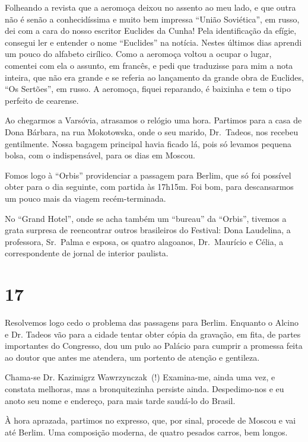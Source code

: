 Folheando a revista que a aeromoça deixou no assento ao meu lado, e que outra não é senão a conhecidíssima e muito bem impressa ``União Soviética'', em russo, dei com a cara do nosso escritor Euclides da Cunha! Pela identificação da efígie, consegui ler e entender o nome ``Euclides'' na notícia. Nestes últimos dias aprendi um pouco do alfabeto cirílico. Como a aeromoça voltou a ocupar o lugar, comentei com ela o assunto, em francês, e pedi que traduzisse para mim a nota inteira, que não era grande e se referia ao lançamento da grande obra de Euclides, ``Os Sertões'', em russo. A aeromoça, fiquei reparando, é baixinha e tem o tipo perfeito de cearense.

Ao chegarmos a Varsóvia, atrasamos o relógio uma hora. Partimos para a casa de Dona Bárbara, na rua Mokotowska, onde o seu marido, Dr.~Tadeos, nos recebeu gentilmente. Nossa bagagem principal havia ficado lá, pois só levamos pequena bolsa, com o indispensável, para os dias em Moscou.

Fomos logo à ``Orbis'' providenciar a passagem para Berlim, que só foi possível obter para o dia seguinte, com partida às 17h15m. Foi bom, para descansarmos um pouco mais da viagem recém-terminada.

No ``Grand Hotel'', onde se acha também um ``bureau'' da ``Orbis'', tivemos a grata surpresa de reencontrar outros brasileiros do Festival: Dona Laudelina, a professora, Sr.~Palma e esposa, os quatro alagoanos, Dr.~Maurício e Célia, a correspondente de jornal de interior paulista.

\section*{17 \adfflatleafright {}}
Resolvemos logo cedo o problema das passagens para Berlim. Enquanto o Alcino e Dr. Tadeos vão para a cidade tentar obter cópia da gravação, em fita, de partes importantes do Congresso, dou um pulo ao Palácio para cumprir a promessa feita ao doutor que antes me atendera, um portento de atenção e gentileza.

Chama-se Dr. Kazimigrz Wawrzynczak~(!) Examina-me, ainda uma vez, e constata melhoras, mas a bronquitezinha persiste ainda. Des\-pe\-di\-mo-nos e eu anoto seu nome e endereço, para mais tarde saudá-lo do Brasil.

À hora aprazada, partimos no expresso, que, por sinal, procede de Moscou e vai até Berlim. Uma composição moderna, de quatro pesados carros, bem longos.

